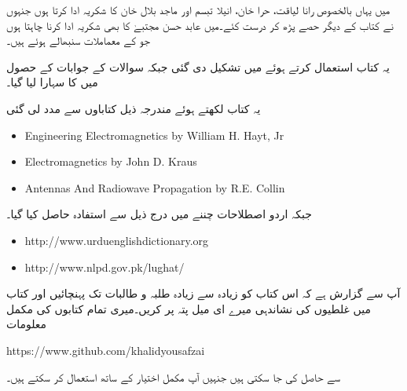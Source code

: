 میں یہاں بالخصوص رانا لیاقت، حرا خان، انیلا تبسم اور ماجد بلال خان کا شکریہ ادا کرتا ہوں جنہوں نے کتاب کے دیگر حصے پڑھ کر درست کئے۔میں عابد حسن مجتبےٰ کا بھی شکریہ ادا کرنا چاہتا ہوں جو  کے معماملات سنبھالے ہوئے ہیں۔

یہ کتاب  استعمال کرتے ہوئے  میں تشکیل دی گئی جبکہ سوالات کے جوابات کے حصول میں  کا سہارا لیا گیا۔

یہ کتاب لکھتے ہوئے مندرجہ ذیل کتاباوں سے مدد لی گئی
{
\begin{otherlanguage}{english}
\begin{itemize}
\item
Engineering Electromagnetics by William H. Hayt, Jr
\item
Electromagnetics by John D. Kraus
\item
Antennas And Radiowave Propagation by R.E. Collin
\end{itemize}
\end{otherlanguage}
}
جبکہ اردو اصطلاحات چننے میں درج ذیل سے استفادہ حاصل کیا گیا۔
{
\begin{otherlanguage}{english}
\begin{itemize}
\item
http:/\!\!/www.urduenglishdictionary.org
\item
http:/\!\!/www.nlpd.gov.pk/lughat/
\end{itemize}
\end{otherlanguage}
}
آپ سے گزارش ہے کہ اس کتاب کو زیادہ سے زیادہ طلبہ و طالبات تک پہنچائیں اور کتاب میں غلطیوں کی نشاندہی میرے  ای میل پتہ پر کریں۔میری تمام کتابوں کی مکمل  معلومات

{
\begin{otherlanguage}{english}
https:/\!\!/www.github.com/khalidyousafzai
\end{otherlanguage}
}

سے حاصل کی جا سکتی ہیں جنہیں آپ مکمل اختیار کے ساتھ استعمال کر سکتے ہیں۔
\vspace{5mm}

{}


